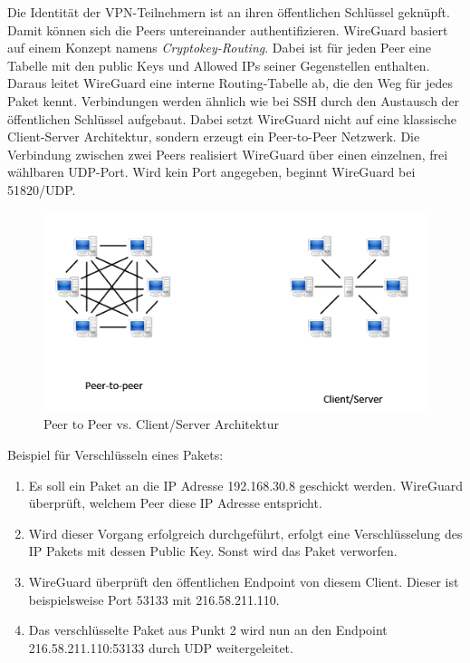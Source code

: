\newpage \noindent
Die Identität der VPN-Teilnehmern ist an ihren öffentlichen Schlüssel geknüpft. Damit können sich die Peers untereinander authentifizieren. WireGuard basiert auf einem Konzept namens \textit{Cryptokey-Routing}. Dabei ist für jeden Peer eine Tabelle mit den public Keys und Allowed IPs seiner Gegenstellen enthalten. Daraus leitet WireGuard eine interne Routing-Tabelle ab, die den Weg für jedes Paket kennt. Verbindungen werden ähnlich wie bei SSH durch den Austausch der öffentlichen Schlüssel aufgebaut. Dabei setzt WireGuard nicht auf eine klassische Client-Server Architektur, sondern erzeugt ein Peer-to-Peer Netzwerk. Die Verbindung zwischen zwei Peers realisiert WireGuard über einen einzelnen, frei wählbaren UDP-Port. Wird kein Port angegeben, beginnt WireGuard bei 51820/UDP.
\begin{figure}[H]
  \centering
  \includegraphics[scale=0.75]{images/peer2peer.png}
  \caption{Peer to Peer vs. Client/Server Architektur}
\end{figure} 
\noindent Beispiel für Verschlüsseln eines Pakets:
\begin{enumerate}
    \item Es soll ein Paket an die IP Adresse 192.168.30.8 geschickt werden. WireGuard überprüft, welchem Peer diese IP Adresse entspricht. 
    \item Wird dieser Vorgang erfolgreich durchgeführt, erfolgt eine Verschlüsselung des IP Pakets mit dessen Public Key. Sonst wird das Paket verworfen.
    \item WireGuard überprüft den öffentlichen Endpoint von diesem Client. Dieser ist beispielsweise Port 53133 mit 216.58.211.110.
    \item Das verschlüsselte Paket aus Punkt 2 wird nun an den Endpoint 216.58.211.110:53133 durch UDP weitergeleitet.\newline
\end{enumerate}
